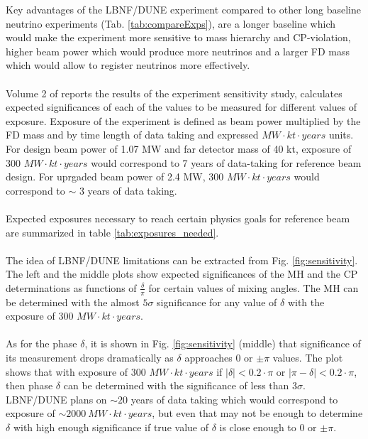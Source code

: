 Key advantages of the LBNF/DUNE experiment compared to other long baseline neutrino experiments (Tab. \ref{tab:compareExps}), are a longer baseline which would make the experiment more sensitive to mass hierarchy and CP-violation, higher beam power which would produce more neutrinos and a larger FD mass which would allow to register neutrinos more effectively. \\ \\
Volume 2 of \cite{ref_LBNF_CDR} reports the results of the experiment sensitivity study, calculates expected significances of each of the values to be measured for different values of exposure. Exposure of the experiment is defined as beam power multiplied by the FD mass and by time length of data taking and expressed $MW \cdot kt \cdot years$ units. For design beam power of 1.07 MW and far detector mass of 40 kt, exposure of 300 $MW \cdot kt \cdot years$ would correspond to 7 years of data-taking for reference beam design. For uprgaded beam power of 2.4 MW, 300 $MW \cdot kt \cdot years$ would correspond to $\sim$ 3 years of data taking.\\ \\
Expected exposures necessary to reach certain physics goals for reference beam are summarized in table \ref{tab:exposures_needed}. \\ \\
The idea of LBNF/DUNE limitations can be extracted from Fig. \ref{fig:sensitivity}. The left and the middle plots show expected significances of the MH and the CP determinations as functions of $\frac{\delta}{\pi}$ for certain values of mixing angles. The MH can be determined with the almost $5\sigma$ significance for any value of $\delta$ with the exposure of 300 $MW \cdot kt \cdot years$. \\ \\
As for the phase $\delta$, it is shown in Fig. \ref{fig:sensitivity} (middle) that significance of its measurement drops dramatically as $\delta$ approaches 0 or $\pm\pi$ values. The plot shows that with exposure of 300 $MW \cdot kt \cdot years$ if $|\delta|<0.2\cdot\pi$ or $|\pi-\delta|<0.2\cdot\pi$, then phase $\delta$ can be determined with the significance of less than $3\sigma$. LBNF/DUNE plans on $\sim 20$ years of data taking which would correspond to exposure of $\sim 2000~MW \cdot kt \cdot years$, but even that may not be enough to determine $\delta$ with high enough significance if true value of $\delta$ is close enough to 0 or $\pm\pi$. \\ \\

